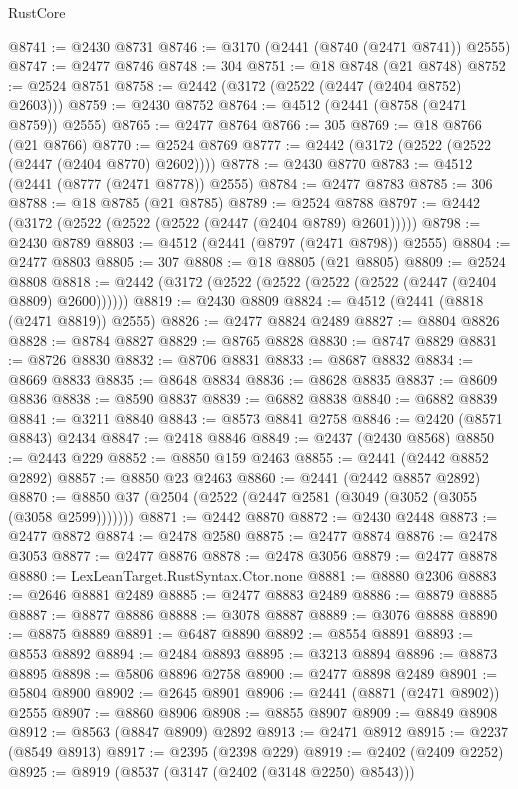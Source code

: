 \begin{lexlean}{RustCore}
\begin{coremodule}
@8741 := @2430 @8731
@8746 := @3170 (@2441 (@8740 (@2471 @8741)) @2555)
@8747 := @2477 @8746
@8748 := 304
@8751 := @18 @8748 (@21 @8748)
@8752 := @2524 @8751
@8758 := @2442 (@3172 (@2522 (@2447 (@2404 @8752) @2603)))
@8759 := @2430 @8752
@8764 := @4512 (@2441 (@8758 (@2471 @8759)) @2555)
@8765 := @2477 @8764
@8766 := 305
@8769 := @18 @8766 (@21 @8766)
@8770 := @2524 @8769
@8777 := @2442 (@3172 (@2522 (@2522 (@2447 (@2404 @8770) @2602))))
@8778 := @2430 @8770
@8783 := @4512 (@2441 (@8777 (@2471 @8778)) @2555)
@8784 := @2477 @8783
@8785 := 306
@8788 := @18 @8785 (@21 @8785)
@8789 := @2524 @8788
@8797 := @2442 (@3172 (@2522 (@2522 (@2522 (@2447 (@2404 @8789) @2601)))))
@8798 := @2430 @8789
@8803 := @4512 (@2441 (@8797 (@2471 @8798)) @2555)
@8804 := @2477 @8803
@8805 := 307
@8808 := @18 @8805 (@21 @8805)
@8809 := @2524 @8808
@8818 := @2442 (@3172 (@2522 (@2522 (@2522 (@2522 (@2447 (@2404 @8809) @2600))))))
@8819 := @2430 @8809
@8824 := @4512 (@2441 (@8818 (@2471 @8819)) @2555)
@8826 := @2477 @8824 @2489
@8827 := @8804 @8826
@8828 := @8784 @8827
@8829 := @8765 @8828
@8830 := @8747 @8829
@8831 := @8726 @8830
@8832 := @8706 @8831
@8833 := @8687 @8832
@8834 := @8669 @8833
@8835 := @8648 @8834
@8836 := @8628 @8835
@8837 := @8609 @8836
@8838 := @8590 @8837
@8839 := @6882 @8838
@8840 := @6882 @8839
@8841 := @3211 @8840
@8843 := @8573 @8841 @2758
@8846 := @2420 (@8571 @8843) @2434
@8847 := @2418 @8846
@8849 := @2437 (@2430 @8568)
@8850 := @2443 @229
@8852 := @8850 @159 @2463
@8855 := @2441 (@2442 @8852 @2892)
@8857 := @8850 @23 @2463
@8860 := @2441 (@2442 @8857 @2892)
@8870 := @8850 @37 (@2504 (@2522 (@2447 @2581 (@3049 (@3052 (@3055 (@3058 @2599)))))))
@8871 := @2442 @8870
@8872 := @2430 @2448
@8873 := @2477 @8872
@8874 := @2478 @2580
@8875 := @2477 @8874
@8876 := @2478 @3053
@8877 := @2477 @8876
@8878 := @2478 @3056
@8879 := @2477 @8878
@8880 := LexLeanTarget.RustSyntax.Ctor.none
@8881 := @8880 @2306
@8883 := @2646 @8881 @2489
@8885 := @2477 @8883 @2489
@8886 := @8879 @8885
@8887 := @8877 @8886
@8888 := @3078 @8887
@8889 := @3076 @8888
@8890 := @8875 @8889
@8891 := @6487 @8890
@8892 := @8554 @8891
@8893 := @8553 @8892
@8894 := @2484 @8893
@8895 := @3213 @8894
@8896 := @8873 @8895
@8898 := @5806 @8896 @2758
@8900 := @2477 @8898 @2489
@8901 := @5804 @8900
@8902 := @2645 @8901
@8906 := @2441 (@8871 (@2471 @8902)) @2555
@8907 := @8860 @8906
@8908 := @8855 @8907
@8909 := @8849 @8908
@8912 := @8563 (@8847 @8909) @2892
@8913 := @2471 @8912
@8915 := @2237 (@8549 @8913)
@8917 := @2395 (@2398 @229)
@8919 := @2402 (@2409 @2252)
@8925 := @8919 (@8537 (@3147 (@2402 (@3148 @2250) @8543)))

\end{coremodule}
\end{lexlean}
